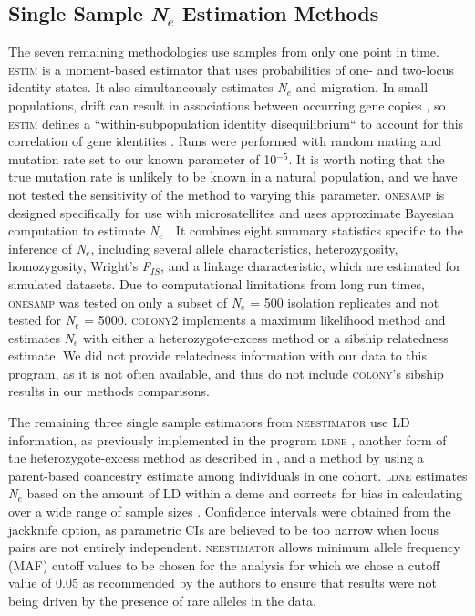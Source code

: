 \subsection{Single Sample \emph{N}$_e$ Estimation Methods}
The seven remaining methodologies use samples from only one point in time. \textsc{estim} \citep{Vitalis:2001c} 
is a moment-based estimator that uses probabilities of one- and two-locus identity states. 
It also simultaneously estimates \emph{N}$_e$ and migration. In small populations, drift 
can result in associations between occurring gene copies \citep{Hill:1968}, so \textsc{estim} 
defines a ``within-subpopulation identity disequilibrium`` to account for this correlation of 
gene identities \citep{Vitalis:2001a}. Runs were performed with random mating and 
mutation rate set to our known parameter of 10$^{-5}$. It is worth noting that the true mutation 
rate is unlikely to be known in a natural population, and we have not tested the sensitivity 
of the method to varying this parameter. \textsc{onesamp} is designed specifically for use 
with microsatellites and uses approximate Bayesian computation to estimate \emph{N}$_e$ 
\citep{Tallmon:2008, Beaumont:2009}. It combines eight summary statistics specific 
to the inference of \emph{N}$_e$, including several allele characteristics, heterozygosity, 
homozygosity, Wright's \emph{F}$_{IS}$, and a linkage characteristic, which are estimated for simulated 
datasets. Due to computational limitations from long run times, \textsc{onesamp} was tested 
on only a subset of \emph{N}$_e$ = 500 isolation replicates and not tested for \emph{N}$_e$ = 5000. 
\textsc{colony2} \citep{Wang:2009} implements a maximum likelihood method and estimates \emph{N}$_e$ 
with either a heterozygote-excess method or a sibship relatedness estimate. We did not provide 
relatedness information with our data to this program, as it is not often available, and thus 
do not include \textsc{colony}'s sibship results in our methods comparisons.

The remaining three single sample estimators from \textsc{neestimator} use LD information, as previously 
implemented in the program \textsc{ldne} \citep{Waples:2008}, another form of the heterozygote-excess 
method as described in \citet{Pudovkin:1996}, and a method by \citet{Nomura:2008} using a parent-based coancestry 
estimate among individuals in one cohort. \textsc{ldne} estimates \emph{N}$_e$ based on the 
amount of LD within a deme \citep{Hill:1981} and corrects for bias in calculating over a wide range of 
sample sizes \citep{Waples:2008}. Confidence intervals were obtained from the jackknife option, 
as parametric CIs are believed to be too narrow when locus pairs are not entirely independent. 
\textsc{neestimator} allows minimum allele frequency (MAF) cutoff values to be chosen for the analysis 
for which we chose a cutoff value of 0.05 as recommended by the authors to ensure that results were 
not being driven by the presence of rare alleles in the data.

